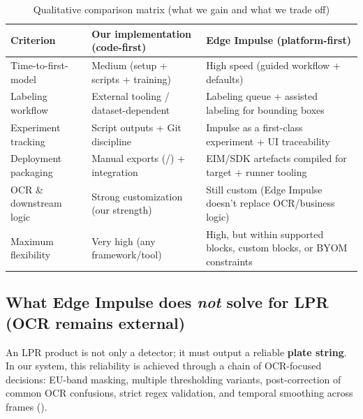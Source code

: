 \begin{table}[htbp]
	\centering
	\caption{Qualitative comparison matrix (what we gain and what we trade off)}
	\label{tab:edge_impulse_matrix}
	\begin{tabular}{@{}p{}p{}p{}@{}}
		\toprule
		\textbf{Criterion} & \textbf{Our implementation (code-first)} & \textbf{Edge Impulse (platform-first)} \\ \midrule
		Time-to-first-model &
		Medium (setup + scripts + training) &
		High speed (guided workflow + defaults) \cite{EdgeImpulseStudioOverview} \\ \addlinespace
		Labeling workflow &
		External tooling / dataset-dependent &
		Labeling queue + assisted labeling for bounding boxes \cite{EdgeImpulseLabelingQueue} \\ \addlinespace
		Experiment tracking &
		Script outputs + Git discipline &
		Impulse as a first-class experiment + UI traceability \cite{EdgeImpulseImpulseDesign} \\ \addlinespace
		Deployment packaging &
		Manual exports (\PYTHON{.pt}/\PYTHON{.engine}) + integration &
		EIM/SDK artefacts compiled for target + runner tooling \cite{EdgeImpulseLinuxEIM,EdgeImpulseLinuxCLI} \\ \addlinespace
		OCR \& downstream logic &
		Strong customization (our strength) &
		Still custom (Edge Impulse doesn't replace OCR/business logic) \\ \addlinespace
		Maximum flexibility &
		Very high (any framework/tool) &
		High, but within supported blocks, custom blocks, or BYOM constraints \cite{EdgeImpulseLearningBlocks,EdgeImpulseBYOM} \\ \bottomrule
	\end{tabular}
\end{table}

\subsection{What Edge Impulse does \emph{not} solve for LPR (OCR remains external)}
\label{sec:edge_impulse_ocr_boundary}

\noindent
An LPR product is not only a detector; it must output a reliable \textbf{plate string}.
In our system, this reliability is achieved through a chain of OCR-focused decisions:
EU-band masking, multiple thresholding variants, post-correction of common OCR confusions, strict regex validation, and temporal smoothing across frames ().

